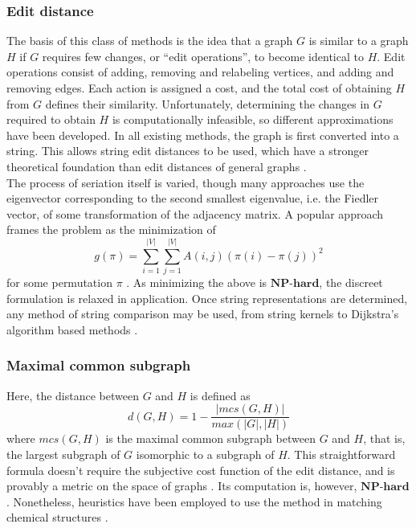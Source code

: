 \documentclass[11pt]{article}
\begin{document}
\subsubsection{Edit distance}
\indent The basis of this class of methods is the idea that a graph $G$ is similar to a graph $H$ if $G$ requires few changes, or ``edit operations'', to become identical to $H$. Edit operations consist of adding, removing and relabeling vertices, and adding and removing edges. Each action is assigned a cost, and the total cost of obtaining $H$ from $G$ defines their similarity. Unfortunately, determining the changes in $G$ required to obtain $H$ is computationally infeasible, so different approximations have been developed. In all existing methods, the graph is first converted into a string. This allows string edit distances to be used, which have a stronger theoretical foundation than edit distances of general graphs \cite{Gao2009}. \vspace{1mm}\\
\indent The process of seriation itself is varied, though many approaches use the eigenvector corresponding to the second smallest eigenvalue, i.e. the Fiedler vector, of some transformation of the adjacency matrix. A popular approach frames the problem as the minimization of
\[
g(\pi) = \sum \limits_{i=1}^{|V|} \sum \limits_{j=1}^{|V|} A(i,j)(\pi(i) - \pi(j))^2
\]
for some permutation $\pi$ \cite{Atkins1994}. As minimizing the above is $\textbf{NP-hard}$, the discreet formulation is relaxed in application. Once string representations are determined, any method of string comparison may be used, from string kernels to Dijkstra's algorithm based methods \cite{Hancock2006} \cite{Robles-Kelly2004}. 
\subsubsection{Maximal common subgraph}
\indent Here, the distance between $G$ and $H$ is defined as
\[
d(G,H) = 1 - \frac{|mcs(G, H)|}{max(|G|,|H|)}
\]
where $mcs(G,H)$ is the maximal common subgraph between $G$ and $H$, that is, the largest subgraph of $G$ isomorphic to a subgraph of $H$. This straightforward formula doesn't require the subjective cost function of the edit distance, and is provably a metric on the space of graphs \cite{Bunke1998}. Its computation is, however, $\textbf{NP-hard}$. Nonetheless, heuristics have been employed to use the method in matching chemical structures \cite{Raymond2002}.
\end{document}
